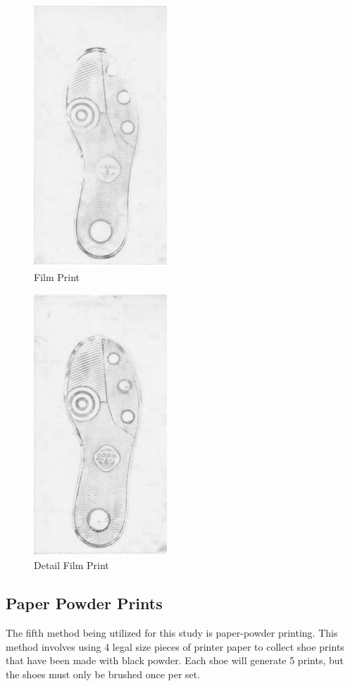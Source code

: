 \begin{figure}[!htp]
\centering
\includegraphics[width=5cm]{Film_1_Baseline}
\caption{Film Print}
\label{Image 15}
\end{figure}

\begin{figure}[!htp]
\centering
\includegraphics[width=5cm]{Film_2_Baseline}
\caption{Detail Film Print}
\label{Image 16}
\end{figure}


\subsection{Paper Powder Prints}

   The fifth method being utilized for this study is paper-powder printing. This method involves using 4 legal size pieces of printer paper to collect shoe prints that have been made with black powder. Each shoe will generate 5 prints, but the shoes must only be brushed once per set. 
   
